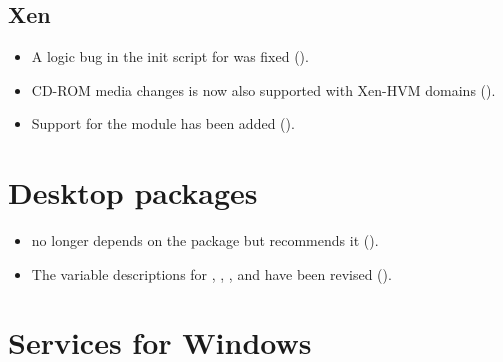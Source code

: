 \subsection{Xen}
\begin{itemize}
\item A logic bug in the init script for  was fixed ().
\item CD-ROM media changes is now also supported with Xen-HVM domains ().
\item Support for the  module has been added ().
\end{itemize}



\section{Desktop packages}
\begin{itemize}
\item {} no longer depends on the package
 but recommends it ().

\item The \ucsUCR{} variable descriptions for
  , ,
  , 
  and  have been revised ().

\end{itemize}


\section{Services for Windows}

